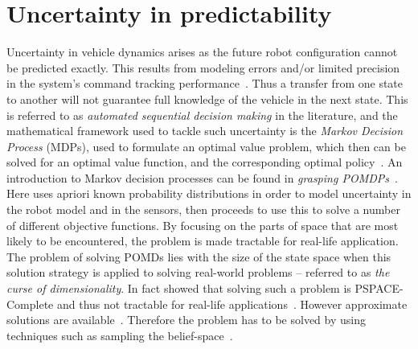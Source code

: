 \section{Uncertainty in predictability}
Uncertainty in vehicle dynamics arises as the future robot configuration cannot
be predicted exactly. This results from modeling errors and/or limited precision
in the system's command tracking
performance~\cite{dadkhahSurveyMotionPlanning2012}. Thus a transfer from one
state to another will not guarantee full knowledge of the vehicle in the next
state. This is referred to as \textit{automated sequential decision making} in
the literature, and the mathematical framework used to tackle such uncertainty
is the \textit{Markov Decision Process} (MDPs), used to formulate an optimal
value problem, which then can be solved for an optimal value function, and the
corresponding optimal policy~\cite{Cassandra:1998:EAA:926710}. An introduction
to Markov decision processes can be found in \textit{grasping
  POMDPs}~\cite{kaelblingPlanningActingPartially1998}. Here
\citeauthor{kaelblingPlanningActingPartially1998} uses apriori known probability
distributions in order to model uncertainty in the robot model and in the
sensors, then proceeds to use this to solve a number of different objective
functions. By focusing on the parts of space that are most likely to be
encountered, the problem is made tractable for real-life application. The
problem of solving POMDs lies with the size of the state space when this
solution strategy is applied to solving real-world problems -- referred to as
\textit{the curse of dimensionality}. In fact
\citeauthor{christosh.papadimitriouComplexityMarkovDecision1987} showed that
solving such a problem is PSPACE-Complete and thus not tractable for real-life
applications~\cite{christosh.papadimitriouComplexityMarkovDecision1987}. However
approximate solutions are available~\cite{kaelblingPlanningActingPartially1998}.
Therefore the problem has to be solved by using techniques such as sampling the
belief-space~\cite{kearns2002sparse}.

